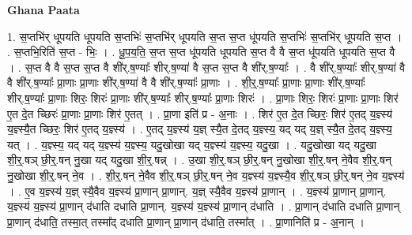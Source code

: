 \documentclass[17pt]{extarticle}
\begin{document}
\textbf{Ghana Paata } \newline

1. स॒प्तभि॑र् धूपयति धूपयति स॒प्तभिः॑ स॒प्तभि॑र् धूपयति स॒प्त स॒प्त धू॑पयति स॒प्तभिः॑ स॒प्तभि॑र् धूपयति स॒प्त । . स॒प्तभि॒रिति॑ स॒प्त - भिः॒ । . धू॒प॒य॒ति॒ स॒प्त स॒प्त धू॑पयति धूपयति स॒प्त वै वै स॒प्त धू॑पयति धूपयति स॒प्त वै । . स॒प्त वै वै स॒प्त स॒प्त वै शी॑र्.ष॒ण्याः᳚ शीर्.ष॒ण्या॑ वै स॒प्त स॒प्त वै शी॑र्.ष॒ण्याः᳚ । . वै शी॑र्.ष॒ण्याः᳚ शीर्.ष॒ण्या॑ वै वै शी॑र्.ष॒ण्याः᳚ प्रा॒णाः प्रा॒णाः शी॑र्.ष॒ण्या॑ वै वै शी॑र्.ष॒ण्याः᳚ प्रा॒णाः । . शी॒र्॒.ष॒ण्याः᳚ प्रा॒णाः प्रा॒णाः शी॑र्.ष॒ण्याः᳚ शीर्.ष॒ण्याः᳚ प्रा॒णाः शिरः॒ शिरः॑ प्रा॒णाः शी॑र्.ष॒ण्याः᳚ शीर्.ष॒ण्याः᳚ प्रा॒णाः शिरः॑ । . प्रा॒णाः शिरः॒ शिरः॑ प्रा॒णाः प्रा॒णाः शिर॑ ए॒त दे॒त च्छिरः॑ प्रा॒णाः प्रा॒णाः शिर॑ ए॒तत् । . प्रा॒णा इति॑ प्र - अ॒नाः । . शिर॑ ए॒त दे॒त च्छिरः॒ शिर॑ ए॒तद् य॒ज्ञ्स्य॑ य॒ज्ञ्स्यै॒त च्छिरः॒ शिर॑ ए॒तद् य॒ज्ञ्स्य॑ । . ए॒तद् य॒ज्ञ्स्य॑ य॒ज्ञ् स्यै॒त दे॒तद् य॒ज्ञ्स्य॒ यद् यद् य॒ज्ञ् स्यै॒त दे॒तद् य॒ज्ञ्स्य॒ यत् । . य॒ज्ञ्स्य॒ यद् यद् य॒ज्ञ्स्य॑ य॒ज्ञ्स्य॒ यदु॒खोखा यद् य॒ज्ञ्स्य॑ य॒ज्ञ्स्य॒ यदु॒खा । . यदु॒खोखा यद् यदु॒खा शी॒र्॒.षञ् छी॒र्॒.षन् नु॒खा यद् यदु॒खा शी॒र्॒.षन्न् । . उ॒खा शी॒र्॒.षञ् छी॒र्॒.षन् नु॒खोखा शी॒र्॒.षन् ने॒वैव शी॒र्॒.षन् नु॒खोखा शी॒र्॒.षन् ने॒व । . शी॒र्॒.षन् ने॒वैव शी॒र्॒.षञ् छी॒र्॒.षन् ने॒व य॒ज्ञ्स्य॑ य॒ज्ञ्स्यै॒व शी॒र्॒.षञ् छी॒र्॒.षन् ने॒व य॒ज्ञ्स्य॑ । . ए॒व य॒ज्ञ्स्य॑ य॒ज्ञ् स्यै॒वैव य॒ज्ञ्स्य॑ प्रा॒णान् प्रा॒णान्. य॒ज्ञ् स्यै॒वैव य॒ज्ञ्स्य॑ प्रा॒णान् । . य॒ज्ञ्स्य॑ प्रा॒णान् प्रा॒णान्. य॒ज्ञ्स्य॑ य॒ज्ञ्स्य॑ प्रा॒णान् द॑धाति दधाति प्रा॒णान्. य॒ज्ञ्स्य॑ य॒ज्ञ्स्य॑ प्रा॒णान् द॑धाति । . प्रा॒णान् द॑धाति दधाति प्रा॒णान् प्रा॒णान् द॑धाति॒ तस्मा॒त् तस्मा᳚द् दधाति प्रा॒णान् प्रा॒णान् द॑धाति॒ तस्मा᳚त् । . प्रा॒णानिति॑ प्र - अ॒नान् । \newline
\end{document}
